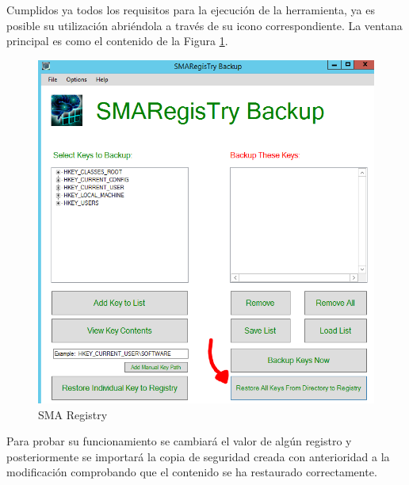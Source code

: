	Cumplidos ya todos los requisitos para la ejecución de la herramienta, ya es posible su utilización abriéndola a través de su icono correspondiente. La ventana principal es como el contenido de la Figura \ref{fig:figura3-10}.
		\begin{figure}[H] %
			\centering
			\includegraphics[scale=0.6]{figuras/ejercicio3/figura3-10.png} 
			\caption{SMA Registry} 
			\label{fig:figura3-10}
		\end{figure}
	\vspace{-10pt}
	Para probar su funcionamiento se cambiará el valor de algún registro y posteriormente se importará la copia de seguridad creada con anterioridad a la modificación comprobando que el contenido se ha restaurado correctamente.
	\vspace{5pt}
	
